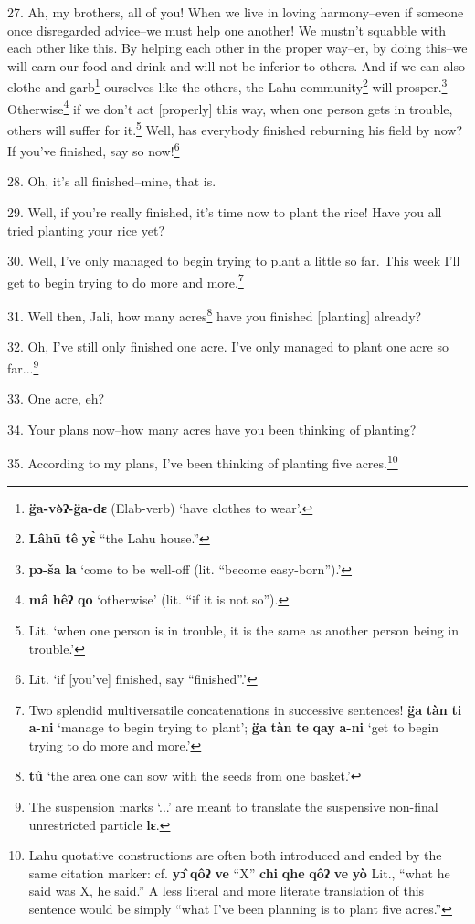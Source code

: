 27. Ah, my brothers, all of you! When we live in loving harmony--even if someone
once disregarded advice--we must help one another! We mustn't squabble with each
other like this. By helping each other in the proper way--er, by doing this--we
will earn our food and drink and will not be inferior to others. And if we can
also clothe and garb\footnote{\textbf{g̈a-və̀ʔ-g̈a-dɛ} (Elab-verb) `have clothes to wear'.} ourselves like the others, the Lahu community\footnote{\textbf{Lâhū} \textbf{tê} \textbf{yɛ̀} ``the Lahu house.''} will
prosper.\footnote{\textbf{pɔ-ša} \textbf{la} `come to be well-off (lit. ``become easy-born'').'} Otherwise\footnote{\textbf{mâ} \textbf{hêʔ} \textbf{qo} `otherwise' (lit. ``if it is not so'').} if we don't act [properly] this way, when one person
gets in trouble, others will suffer for it.\footnote{Lit. `when one person is in trouble, it is the same as another person being in trouble.'} Well, has everybody finished reburning
his field by now? If you've finished, say so now!\footnote{Lit. `if [you've] finished, say ``finished''.'}

28. Oh, it's all finished--mine, that is.

29. Well, if you're really finished, it's time now to plant the rice! Have you
all tried planting your rice yet?

30. Well, I've only managed to begin trying to plant a little so far. This week
I'll get to begin trying to do more and more.\footnote{Two splendid multiversatile concatenations in successive sentences! \textbf{g̈a} \textbf{tàn} \textbf{ti} \textbf{a-ni} `manage to begin trying to plant'; \textbf{g̈a} \textbf{tàn} \textbf{te} \textbf{qay} \textbf{a-ni} `get to begin trying to do more and more.'}

31. Well then, Jali, how many acres\footnote{\textbf{tû} `the area one can sow with the seeds from one basket.'} have you finished [planting] already?

32. Oh, I've still only finished one acre. I've only managed to plant one acre
so far...\footnote{The suspension marks `...' are meant to translate the suspensive non-final unrestricted particle \textbf{lɛ}.}

33. One acre, eh?

34. Your plans now--how many acres have you been thinking of planting?

35. According to my plans, I've been thinking of planting five acres.\footnote{Lahu quotative constructions are often both introduced and ended by the same citation marker: cf. \textbf{yɔ̂} \textbf{qôʔ} \textbf{ve} ``X'' \textbf{chi} \textbf{qhe} \textbf{qôʔ} \textbf{ve} \textbf{yò} Lit., ``what he said was X, he said.'' A less literal and more literate translation of this sentence would be simply ``what I've been planning is to plant five acres.''}

